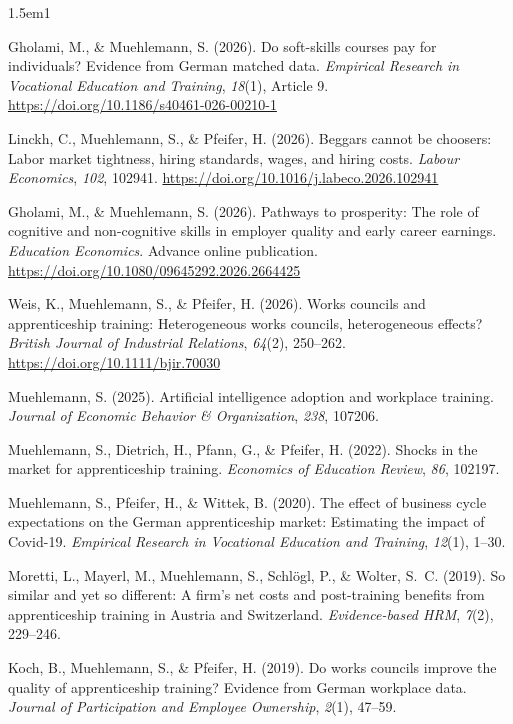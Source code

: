 \documentclass[11pt,a4paper]{article}
\begin{document}
\begin{hangparas}{1.5em}{1}

Gholami, M., \& Muehlemann, S. (2026). Do soft-skills courses pay for individuals? Evidence from German matched data. \textit{Empirical Research in Vocational Education and Training}, \textit{18}(1), Article 9. \url{https://doi.org/10.1186/s40461-026-00210-1}

Linckh, C., Muehlemann, S., \& Pfeifer, H. (2026). Beggars cannot be choosers: Labor market tightness, hiring standards, wages, and hiring costs. \textit{Labour Economics}, \textit{102}, 102941. \url{https://doi.org/10.1016/j.labeco.2026.102941}

Gholami, M., \& Muehlemann, S. (2026). Pathways to prosperity: The role of cognitive and non-cognitive skills in employer quality and early career earnings. \textit{Education Economics}. Advance online publication. \url{https://doi.org/10.1080/09645292.2026.2664425}

Weis, K., Muehlemann, S., \& Pfeifer, H. (2026). Works councils and apprenticeship training: Heterogeneous works councils, heterogeneous effects? \textit{British Journal of Industrial Relations}, \textit{64}(2), 250--262. \url{https://doi.org/10.1111/bjir.70030}

Muehlemann, S. (2025). Artificial intelligence adoption and workplace training. \textit{Journal of Economic Behavior \& Organization}, \textit{238}, 107206.

Muehlemann, S., Dietrich, H., Pfann, G., \& Pfeifer, H. (2022). Shocks in the market for apprenticeship training. \textit{Economics of Education Review}, \textit{86}, 102197.

Muehlemann, S., Pfeifer, H., \& Wittek, B. (2020). The effect of business cycle expectations on the German apprenticeship market: Estimating the impact of Covid-19. \textit{Empirical Research in Vocational Education and Training}, \textit{12}(1), 1--30.

Moretti, L., Mayerl, M., Muehlemann, S., Schl\"ogl, P., \& Wolter, S.~C. (2019). So similar and yet so different: A firm's net costs and post-training benefits from apprenticeship training in Austria and Switzerland. \textit{Evidence-based HRM}, \textit{7}(2), 229--246.

Koch, B., Muehlemann, S., \& Pfeifer, H. (2019). Do works councils improve the quality of apprenticeship training? Evidence from German workplace data. \textit{Journal of Participation and Employee Ownership}, \textit{2}(1), 47--59.


\end{hangparas}
\end{document}

